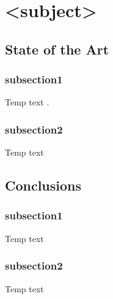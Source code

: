 \section{<subject>}

\subsection{State of the Art}
\subsubsection{subsection1}
Temp text \cite{palomeras2012}.
\subsubsection{subsection2}
Temp text

\subsection{Conclusions}
\subsubsection{subsection1}
Temp text
\subsubsection{subsection2}
Temp text
